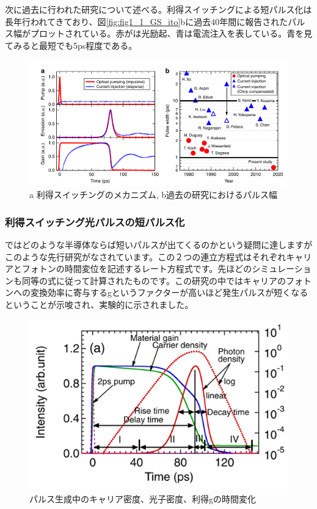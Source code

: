 次に過去に行われた研究について述べる。利得スイッチングによる短パルス化は長年行われてきており、図\ref{fig:fig1_1_GS_ito}bに過去40年間に報告されたパルス幅がプロットされている。赤がは光励起、青は電流注入を表している。青を見てみると最短でも5ps程度である。
\begin{figure}[h]
	\centering
	\includegraphics[width=15cm]{figure/fig_1_1_GS_ito.png}
	\caption{a 利得スイッチングのメカニズム, b過去の研究におけるパルス幅\cite{ref_t_ito}}
	\label{fig:fig_1_1_GS_ito}
\end{figure}

\subsubsection{利得スイッチング光パルスの短パルス化}

ではどのような半導体ならば短いパルスが出てくるのかという疑問に達しますがこのような先行研究がなされています。この２つの連立方程式はそれぞれキャリアとフォトンの時間変位を記述するレート方程式です。先ほどのシミュレーションも同等の式に従って計算されたものです。この研究の中ではキャリアのフォトンへの変換効率に寄与するgというファクターが高いほど発生パルスが短くなるということが示唆され、実験的に示されました。

\begin{figure}[h]
	\centering
	\includegraphics[width=15cm]{figure/fig_1_1_GS_pulse.png}
	\caption{パルス生成中のキャリア密度、光子密度、利得gの時間変化\cite{ref_1_1_GS}}
	\label{fig:fig_1_1_GS_pulse}
\end{figure}

